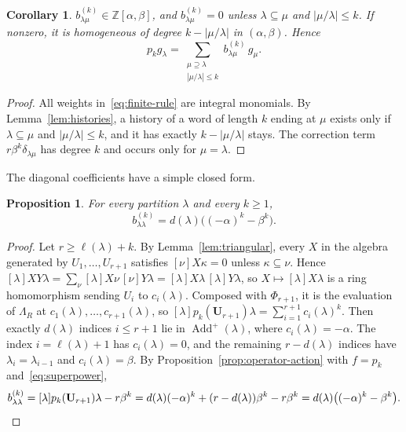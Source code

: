 \documentclass[11pt]{amsart}
\numberwithin{equation}{section}
\newtheorem{proposition}[theorem]{Proposition}
\newtheorem{corollary}[theorem]{Corollary}
\theoremstyle{definition}
\theoremstyle{remark}
\newcommand{\Lam}{\Lambda}
\newcommand{\Add}{\operatorname{Add}}
\newcommand{\bfU}{\mathbf U}
\newcommand{\ZZ}{\mathbb Z}
\begin{document}
\begin{corollary}\label{cor:support}
$b^{(k)}_{\lambda\mu}\in\ZZ[\alpha,\beta]$, and $b^{(k)}_{\lambda\mu}=0$ unless
$\lambda\subseteq\mu$ and $|\mu/\lambda|\leq k$. If nonzero, it is homogeneous
of degree $k-|\mu/\lambda|$ in $(\alpha,\beta)$. Hence
\[
 p_kg_\lambda=\sum_{\substack{\mu\supseteq\lambda\\|\mu/\lambda|\leq k}}
 b^{(k)}_{\lambda\mu}\,g_\mu.
\]
\end{corollary}

\begin{proof}
All weights in~\eqref{eq:finite-rule} are integral monomials. By
Lemma~\ref{lem:histories}, a history of a word of length $k$ ending at $\mu$
exists only if $\lambda\subseteq\mu$ and $|\mu/\lambda|\leq k$, and it has
exactly $k-|\mu/\lambda|$ stays. The correction term $r\beta^k\delta_{\lambda\mu}$ has degree $k$ and
occurs only for $\mu=\lambda$.
\end{proof}

The diagonal coefficients have a simple closed form.

\begin{proposition}\label{prop:diagonal}
For every partition $\lambda$ and every $k\geq1$,
\[
 b^{(k)}_{\lambda\lambda}=d(\lambda)\bigl((-\alpha)^k-\beta^k\bigr).
\]
\end{proposition}

\begin{proof}
Let $r\geq\ell(\lambda)+k$. By Lemma~\ref{lem:triangular}, every $X$ in the
algebra generated by $U_1,\dots,U_{r+1}$ satisfies $[\nu]X\kappa=0$ unless
$\kappa\subseteq\nu$. Hence
$[\lambda]XY\lambda=\sum_\nu[\lambda]X\nu\,[\nu]Y\lambda=[\lambda]X\lambda\,[\lambda]Y\lambda$,
so $X\mapsto[\lambda]X\lambda$ is a ring homomorphism sending $U_i$ to
$c_i(\lambda)$. Composed with $\Phi_{r+1}$, it is the evaluation of $\Lam_R$
at $c_1(\lambda),\dots,c_{r+1}(\lambda)$, so
$[\lambda]p_k(\bfU_{r+1})\lambda=\sum_{i=1}^{r+1}c_i(\lambda)^k$. Then exactly $d(\lambda)$ indices $i\leq r+1$ lie in
$\Add^+(\lambda)$, where $c_i(\lambda)=-\alpha$. The index $i=\ell(\lambda)+1$
has $c_i(\lambda)=0$, and the remaining $r-d(\lambda)$ indices have
$\lambda_i=\lambda_{i-1}$ and $c_i(\lambda)=\beta$. By
Proposition~\ref{prop:operator-action} with $f=p_k$
and~\eqref{eq:superpower},
\[
 b^{(k)}_{\lambda\lambda}=[\lambda]p_k(\bfU_{r+1})\lambda-r\beta^k
 =d(\lambda)(-\alpha)^k+(r-d(\lambda))\beta^k-r\beta^k
 =d(\lambda)\bigl((-\alpha)^k-\beta^k\bigr).\qedhere
\]
\end{proof}
\end{document}
